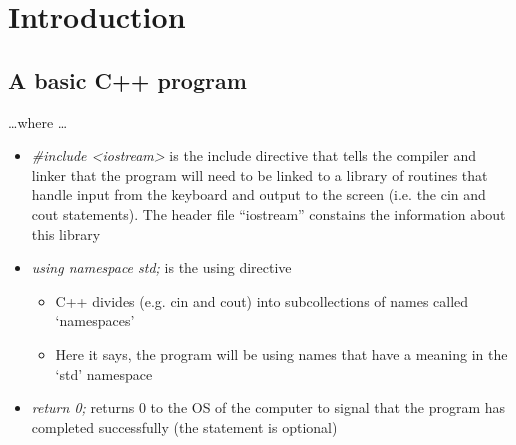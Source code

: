 \section{Introduction}

\subsection{A basic C++ program}

\ldots where \ldots

\begin{itemize}	
	\item \emph{\#include \textless iostream\textgreater} is the include directive that tells the compiler and linker that the program
	will need to be linked to a library of routines that handle input from the keyboard and output to the screen (i.e. the cin and cout
	statements). The header file ``iostream'' constains the information about this library 
	\item \emph{using namespace std;} is the using directive
	\begin{itemize}
		\item C++ divides (e.g. cin and cout) into subcollections of names called `namespaces'
		\item Here it says, the program will be using names that have a meaning in the `std' namespace
	\end{itemize}	
	\item \emph{return 0;} returns 0 to the OS of the computer to signal that the program has completed successfully
	(the statement is optional)
		
\end{itemize}

